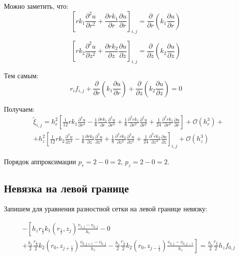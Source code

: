 Можно заметить, что:
\[
  \left[ rk_1 \frac{\partial^2 u}{\partial r^2} + \frac{\partial rk_1}{\partial r}\frac{\partial u}{\partial r} \right]_{i, j} =
  \frac{\partial}{\partial r} \left( k_1 \frac{\partial u}{\partial r} \right)
\]

\[
  \left[ r k_2 \frac{\partial^2 u}{\partial z^2} + \frac{\partial r k_2}{\partial z} \frac{\partial u}{\partial z} \right]_{i, j} =
  \frac{\partial}{\partial z} \left( k_2 \frac{\partial u}{\partial z} \right)
\]

Тем самым:
\[
  r_if_{i, j} + \frac{\partial}{\partial r} \left( k_1 \frac{\partial u}{\partial r} \right) +
  \frac{\partial}{\partial z} \left( k_2 \frac{\partial u}{\partial z} \right) = 0
\]

Получаем:
\begin{align*}
  &\tilde{\xi}_{i, j} = 
  h^2_r\left[ \frac{1}{12} r k_1 \frac{\partial^4 u}{\partial r^4} - \frac{1}{6}\frac{\partial rk_1}{\partial r}\frac{\partial^3 u}{\partial r^3}
  + \frac{1}{8} \frac{\partial^2 rk_1}{\partial r^2}\frac{\partial^2 u}{\partial r^2}
  + \frac{1}{24} \frac{\partial^3 rk_1}{\partial r^3}\frac{\partial u}{\partial r} \right] + \mathcal{O}(h_r^3) + \\
  &+ h^2_z \left[
    \frac{1}{12} r k_2 \frac{\partial^4 u}{\partial z^4} - \frac{1}{6} \frac{\partial r k_2}{\partial z} \frac{\partial^3 u}{\partial z^3}
    + \frac{1}{8} \frac{\partial^2 r k_2}{\partial z^2} \frac{\partial^2 u}{\partial z^2}
    + \frac{1}{24} \frac{\partial^3 r k_2}{\partial z^3} \frac{\partial u}{\partial z}
     \right]_{i, j} + \mathcal{O}(h_z^3)
\end{align*}

Порядок аппроксимации $p_r = 2 - 0 = 2 $, $ p_z = 2 - 0 = 2 $.

\subsection{Невязка на левой границе}

Запишем для уравнения разностной сетки на левой границе невязку:

\begin{align*}
  &- \left [ 
    h_z r_{\frac{1}{2}} k_1(r_{\frac{1}{2}}, z_j) \frac{v_{1, j} - v_{0, j}}{h_{r}}
    - 0
    \right . \\
    &\left .
    + \frac{h_r}{2} \frac{r_{\frac{1}{2}}}{2} k_2(r_0, z_{j+\frac{1}{2}}) \frac{v_{0, j + 1} - v_{0, j}}{h_{z}}
    - \frac{h_r}{2} \frac{r_{\frac{1}{2}}}{2} k_2(r_0, z_{j-\frac{1}{2}}) \frac{v_{0, j} - v_{0, j - 1}}{h_z}
    \right ]  = \frac{h_r}{2} \frac{r_{\frac{1}{2}}}{2} h_z f_{0, j}
\end{align*}

